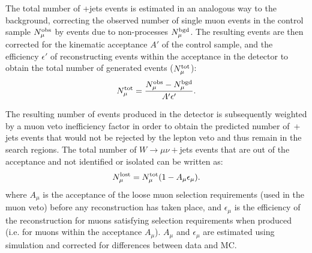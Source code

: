 The total number of \wmunubr{}+jets events is estimated in an analogous way to the \znunubr{} background,
correcting the observed number of single muon events in the control sample $N^{\rm obs}_{\mu}$ by events due to non-\wpj processes $N^{\rm bgd}_{\mu}$.  
The resulting \wmunu events are then corrected for the kinematic acceptance $A'$ of the control sample, and the efficiency $\epsilon'$ of reconstructing events within the acceptance in the detector to obtain the total number of generated events ($N^{\rm tot}_{\mu}$):
\begin{equation}
N^{\rm tot}_{\mu} = \frac{N^{\rm obs}_{\mu} - N^{\rm bgd}_{\mu}}{A'\epsilon'}.\label{eqn:Ntot}
\end{equation}

The resulting number of \wmunu events produced in the detector is subsequently weighted by a muon veto inefficiency factor in order to obtain the predicted number of \wmunubr\,+\,jets events that would not be rejected by the lepton veto and thus remain in the search regions.
%
The total number of $W \rightarrow \mu\nu +$jets events that are out of the acceptance and not identified or isolated can be written as:
\begin{equation}
N^{\rm lost}_{\mu} = N^{\rm tot}_{\mu}(1 - A_{\mu}\epsilon_{\mu}).
\end{equation}
where $A_{\mu}$ is the acceptance of the loose muon selection requirements (used in the muon veto) before any reconstruction has taken place, 
and $\epsilon_{\mu}$ is the efficiency of the reconstruction for muons satisfying selection requirements when produced (i.e. for muons within the acceptance $A_{\mu}$).
$A_{\mu}$ and $\epsilon_{\mu}$ are estimated using simulation and corrected for differences between data and MC.

